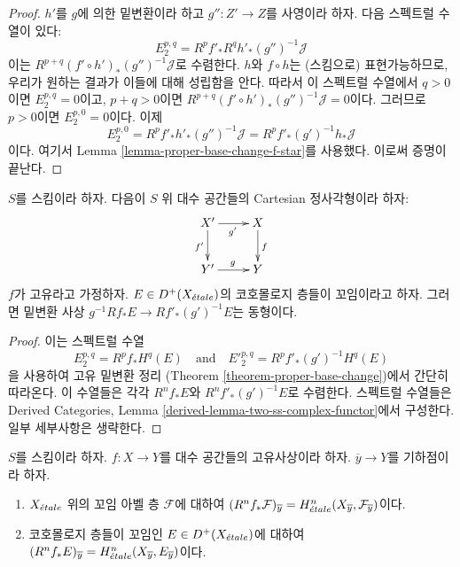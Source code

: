 \begin{proof}
\medskip\noindent
$h'$를 $g$에 의한 밑변환이라 하고
$g'' : Z' \to Z$를 사영이라 하자. 다음 스펙트럴 수열이 있다:
$$
E_2^{p, q} = R^pf'_* R^qh'_* (g'')^{-1}\mathcal{J}
$$
이는 $R^{p + q}(f' \circ h')_*(g'')^{-1}\mathcal{J}$로 수렴한다.
$h$와 $f \circ h$는 (스킴으로) 표현가능하므로, 우리가 원하는
결과가 이들에 대해 성립함을 안다. 따라서 이 스펙트럴 수열에서
$q > 0$이면 $E_2^{p, q} = 0$이고, $p + q > 0$이면
$R^{p + q}(f' \circ h')_*(g'')^{-1}\mathcal{J} = 0$이다.
그러므로 $p > 0$이면 $E_2^{p, 0} = 0$이다. 이제
$$
E_2^{p, 0} = R^pf'_* h'_* (g'')^{-1}\mathcal{J} =
R^pf'_* (g')^{-1}h_*\mathcal{J}
$$
이다. 여기서 Lemma \ref{lemma-proper-base-change-f-star}를 사용했다.
이로써 증명이 끝난다.
\end{proof}



\begin{lemma}
\label{lemma-proper-base-change}
$S$를 스킴이라 하자. 다음이 $S$ 위 대수 공간들의 Cartesian
정사각형이라 하자:
$$
\xymatrix{
X' \ar[r]_{g'} \ar[d]_{f'} & X \ar[d]^f \\
Y' \ar[r]^g & Y
}
$$
$f$가 고유라고 가정하자.
$E \in D^+(X_{\acute{e}tale})$의 코호몰로지 층들이 꼬임이라고 하자.
그러면 밑변환 사상 $g^{-1}Rf_*E \to Rf'_*(g')^{-1}E$는 동형이다.
\end{lemma}

\begin{proof}
이는 스펙트럴 수열
$$
E_2^{p, q} = R^pf_*H^q(E)
\quad\text{and}\quad
{E'}_2^{p, q} = R^pf'_*(g')^{-1}H^q(E)
$$
을 사용하여 고유 밑변환 정리
(Theorem \ref{theorem-proper-base-change})에서 간단히 따라온다.
이 수열들은 각각 $R^nf_*E$와 $R^nf'_*(g')^{-1}E$로 수렴한다.
스펙트럴 수열들은 Derived Categories, Lemma
\ref{derived-lemma-two-ss-complex-functor}에서 구성한다.
일부 세부사항은 생략한다.
\end{proof}

\begin{lemma}
\label{lemma-proper-base-change-stalk}
$S$를 스킴이라 하자.
$f : X \to Y$를 대수 공간들의 고유사상이라 하자.
$\overline{y} \to Y$를 기하점이라 하자.
\begin{enumerate}
\item $X_{\acute{e}tale}$ 위의 꼬임 아벨 층 $\mathcal{F}$에 대하여
$(R^nf_*\mathcal{F})_{\overline{y}} =
H^n_{\acute{e}tale}(X_{\overline{y}}, \mathcal{F}_{\overline{y}})$이다.
\item 코호몰로지 층들이 꼬임인 $E \in D^+(X_{\acute{e}tale})$에 대하여
$(R^nf_*E)_{\overline{y}} = H^n_{\acute{e}tale}(X_{\overline{y}},
E_{\overline{y}})$이다.
\end{enumerate}
\end{lemma}

